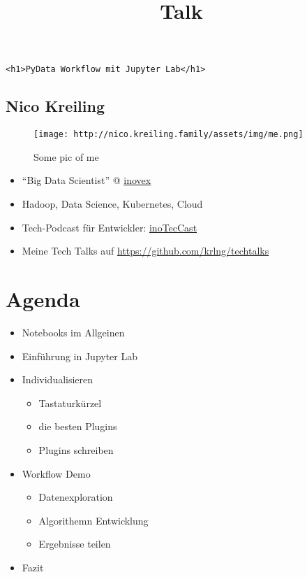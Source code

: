 \documentclass[11pt]{article}
\title{Talk}
\makeatletter
\def\maxwidth{\ifdim\Gin@nat@width>\linewidth\linewidth
    \else\Gin@nat@width\fi}
\let\Oldincludegraphics\includegraphics
\renewcommand{\includegraphics}[1]{\Oldincludegraphics[width=.8\maxwidth]{#1}}
\providecommand{\tightlist}{%
      \setlength{\itemsep}{0pt}\setlength{\parskip}{0pt}}
\makeatother
\begin{document}
    
    
    \maketitle
    
    

    
    \begin{verbatim}
<h1>PyData Workflow mit Jupyter Lab</h1>
\end{verbatim}

    \hypertarget{nico-kreiling}{%
\subsection{Nico Kreiling}\label{nico-kreiling}}

\begin{figure}
\centering
\texttt{[image: http://nico.kreiling.family/assets/img/me.png]}
\caption{Some pic of me}
\end{figure}

\begin{itemize}
\tightlist
\item
  ``Big Data Scientist'' @ \href{https://www.inovex.de/de/}{inovex}
\item
  Hadoop, Data Science, Kubernetes, Cloud
\item
  Tech-Podcast für Entwickler: \href{https://inoteccast.de/}{inoTecCast}
\item
  Meine Tech Talks auf \url{https://github.com/krlng/techtalks}
\end{itemize}

    \hypertarget{agenda}{%
\section{Agenda}\label{agenda}}

\begin{itemize}
\tightlist
\item
  Notebooks im Allgeinen
\item
  Einführung in Jupyter Lab
\item
  Individualisieren

  \begin{itemize}
  \tightlist
  \item
    Tastaturkürzel
  \item
    die besten Plugins
  \item
    Plugins schreiben
  \end{itemize}
\item
  Workflow Demo

  \begin{itemize}
  \tightlist
  \item
    Datenexploration
  \item
    Algorithemn Entwicklung
  \item
    Ergebnisse teilen
  \end{itemize}
\item
  Fazit
\end{itemize}
\end{document}
